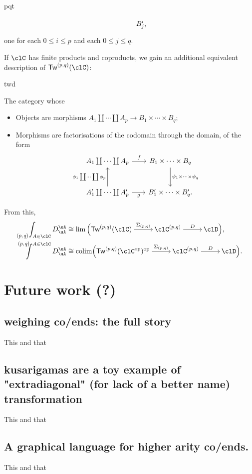 \documentclass[11pt]{amsart}
\begin{document}
\begin{proposition}
\begin{enumtag}{pqt}
\begin{itemize}
\[\begin{tikzcd}[row sep={4.5em,between origins}, column sep={4.5em,between origins}, ampersand replacement=\&]
					      \&
					      B_{j}',
				      \end{tikzcd}
			      \]
			      one for each $0\leq i\leq p$ and each $0\leq j\leq q$.
		\end{itemize}
	\end{enumtag}
	If $\clC$ has finite products and coproducts, we gain an additional equivalent description of $\pqTw{p}{q}{\clC}$:
	\begin{enumtag}{twd}
		\item\label{PQT3}The category whose
		\begin{itemize}
			\item Objects are morphisms $A_{1}\coprod\cdots\coprod A_{p}\longrightarrow B_{1}\times\cdots\times B_{q}$;
			\item Morphisms are factorisations of the codomain through the domain, of the form
			      \[
				      \begin{tikzcd}[row sep={4.5em,between origins}, column sep={9.0em,between origins}, ampersand replacement=\&]
					      A_{1}\coprod\cdots\coprod A_{p}
					      \arrow[r,"f"]
					      \&
					      B_{1}\times\cdots\times B_{q}
					      \arrow[d,"\psi_{1}\times\cdots\times\psi_{q}"]
					      \\
					      \arrow[u,"\phi_{1}\coprod\cdots\coprod\phi_{p}"]
					      A_{1}'\coprod\cdots\coprod A_{p}'
					      \arrow[r,"g"']
					      \&
					      B_{1}'\times\cdots\times B_{q}'.
				      \end{tikzcd}
			      \]
		\end{itemize}
	\end{enumtag}
\end{proposition}
From this, 
\begin{align*}
	\pqEnd{p}{q}{A\in\clC}D^{\uA}_{\uA}   & \cong \lim\Big(\pqTw{p}{q}{\clC}\xloongrightarrow{\Sigma_{(p,q)}}\pq{\clC}\xloongrightarrow{D}\clD\Big),               \\
	\pqCoend{p}{q}{A\in\clC}D^{\uA}_{\uA} & \cong \colim\Big(\pqTw{p}{q}{\clC^{\op}}^{\op}\xloongrightarrow{\Sigma_{(p,q)}}\pq{\clC}\xloongrightarrow{D}\clD\Big).
\end{align*}
\section{Future work (?)}
\label{sec:org06e498e}
\subsection{weighing co/ends: the full story}
This and that
\subsection{kusarigamas are a toy example of "extradiagonal" (for lack of a better name) transformation}
This and that 
\subsection{A graphical language for higher arity co/ends.} This and that
\end{document}
